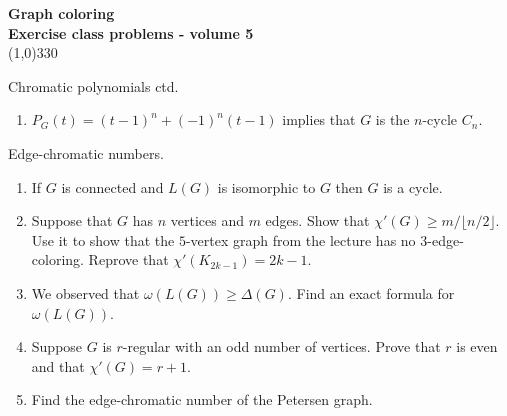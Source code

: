 \documentclass[a4paper]{article}
\begin{document}
\pagestyle{empty}
\begin{center}
	{\Large\bf Graph coloring}\\
	{\large\bf Exercise class problems - volume 5}\\
	\line(1,0){330}
\end{center}

Chromatic polynomials ctd.
\begin{enumerate}
\item $P_G(t)=(t-1)^n+(-1)^n(t-1)$ implies that $G$ is the $n$-cycle $C_n$.
\end{enumerate}

Edge-chromatic numbers.

\begin{enumerate}
\item If $G$ is connected and $L(G)$ is isomorphic to $G$ then $G$ is a cycle.
\item Suppose that $G$ has $n$ vertices and $m$ edges. Show that $\chi'(G)\geq m/\lfloor n/2\rfloor$. Use it to show that the $5$-vertex graph from the lecture has no $3$-edge-coloring. Reprove that $\chi'(K_{2k-1})=2k-1$.
\item We observed that $\omega(L(G))\geq\Delta(G)$. Find an exact formula for $\omega(L(G))$.
\item Suppose $G$ is $r$-regular with an odd number of vertices. Prove that $r$ is even and that $\chi'(G)=r+1$.
\item Find the edge-chromatic number of the Petersen graph.
\end{enumerate}
\end{document}

